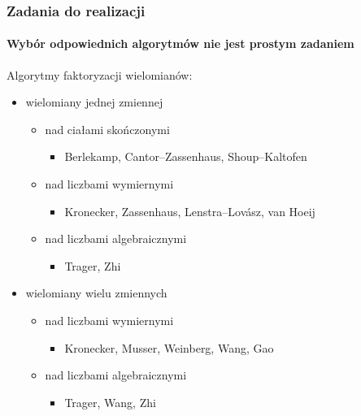 \documentclass{beamer}
\begin{document}
\begin{frame}
    \frametitle{Zadania do realizacji}
    \framesubtitle{Wybór odpowiednich algorytmów nie jest prostym zadaniem}

    Algorytmy faktoryzacji wielomianów:
    \begin{itemize}
        \item wielomiany jednej zmiennej
            \begin{itemize}
                \item nad ciałami skończonymi
                    \begin{itemize}
                        \item Berlekamp, Cantor--Zassenhaus, Shoup--Kaltofen
                    \end{itemize}
                \item nad liczbami wymiernymi
                    \begin{itemize}
                        \item Kronecker, Zassenhaus, Lenstra--Lov\'{a}sz, van Hoeij
                    \end{itemize}
                \item nad liczbami algebraicznymi
                    \begin{itemize}
                        \item Trager, Zhi
                    \end{itemize}
            \end{itemize}
        \pause
        \item wielomiany wielu zmiennych
            \begin{itemize}
                \item nad liczbami wymiernymi
                    \begin{itemize}
                        \item Kronecker, Musser, Weinberg, Wang, Gao
                    \end{itemize}
                \item nad liczbami algebraicznymi
                    \begin{itemize}
                        \item Trager, Wang, Zhi
                    \end{itemize}
            \end{itemize}
    \end{itemize}
\end{frame}
\end{document}
